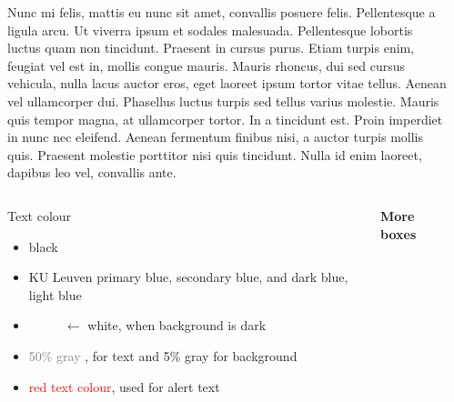 \documentclass{beamer}
\begin{document}
\begin{frame}[t,fragile]
\begin{columns}[T,totalwidth=\textwidth]
\begin{column}{.48\textwidth}
	\end{column}





	\begin{column}{.48\textwidth}
	\justifying
	Nunc mi felis, mattis eu nunc sit amet, convallis posuere felis. Pellentesque a ligula arcu. Ut viverra ipsum et sodales malesuada. Pellentesque lobortis luctus quam non tincidunt. Praesent in cursus purus. Etiam turpis enim, feugiat vel est in, mollis congue mauris. Mauris rhoncus, dui sed cursus vehicula, nulla lacus auctor eros, eget laoreet ipsum tortor vitae tellus. Aenean vel ullamcorper dui. Phasellus luctus turpis sed tellus varius molestie. Mauris quis tempor magna, at ullamcorper tortor. In a tincidunt est. Proin imperdiet in nunc nec eleifend. Aenean fermentum finibus nisi, a auctor turpis mollis quis. Praesent molestie porttitor nisi quis tincidunt. Nulla id enim laoreet, dapibus leo vel, convallis ante.
	
	\vspace{1em}
	\begin{columns}[T,totalwidth=\textwidth]
		
	\begin{column}{.24\textwidth}
	\begin{block}{Text colour}
		\begin{itemize}
			\item black
			\item \textcolor{kul-blue}{KU Leuven primary blue}, \textcolor{kul-secblue}{secondary blue}, and \textcolor{kul-dark}{dark blue}, \textcolor{kul-light}{light blue}
			\item \textcolor{white}{white} $\leftarrow$ white, when background is dark
			\item \textcolor{gray}{50\% gray }, for text and \textcolor{lgray}{5\% gray} for background
		
			\vspace{5mm}
			\item \textcolor{red}{red text colour}, used for \alert{alert text}
		\end{itemize}	\end{block}

		\end{column}
	
	
	\begin{column}{.48\textwidth}
	
	\vspace{24pt}
	{\bfseries\large More boxes}	
	

\end{column}
\end{columns}
\end{column}
\end{columns}
\end{frame}
\end{document}
